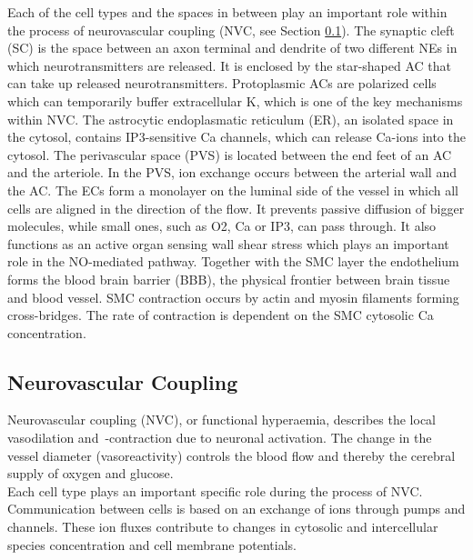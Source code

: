 Each of the cell types and the spaces in between play an important role within the process of neurovascular coupling (\gls{NVC}, see Section \ref{section:NVC}). The synaptic cleft (\gls{SC}) is the space between an axon terminal and dendrite of two different \gls{NE}s in which neurotransmitters are released. It is enclosed by the star-shaped \gls{AC} that can take up released neurotransmitters. Protoplasmic \gls{AC}s are  polarized cells which can temporarily buffer extracellular \gls{K}, which is one of the key mechanisms within \gls{NVC}.  The astrocytic endoplasmatic reticulum (\gls{ER}), an isolated space in the cytosol, contains \gls{IP3}-sensitive \gls{Ca} channels, which can release \gls{Ca}-ions into the cytosol. The perivascular space (\gls{PVS}) is located between the end feet of an \gls{AC} and the arteriole. In the \gls{PVS}, ion exchange occurs between the arterial wall and the \gls{AC}.  The \gls{EC}s form a monolayer on the luminal side of the vessel in which all cells are aligned in the direction of the flow. It prevents passive diffusion of bigger molecules, while small ones, such as \gls{O2}, \gls{Ca} or \gls{IP3}, can pass through.  It also functions as an active organ sensing wall shear stress which plays an important role in the \gls{NO}-mediated pathway. Together with the SMC layer the endothelium forms the blood brain barrier (BBB), the physical frontier between brain tissue and blood vessel.
\gls{SMC} contraction occurs by actin and myosin filaments forming cross-bridges. The rate of contraction is dependent on the \gls{SMC} cytosolic \gls{Ca} concentration.\\
 






\subsection{Neurovascular Coupling} \label{section:NVC}
Neurovascular coupling (\gls{NVC}), or functional hyperaemia, describes the local vasodilation and~-contraction due to neuronal activation. The change in the vessel diameter (vasoreactivity) controls the blood flow and thereby the cerebral supply of oxygen and glucose. \\

Each cell type plays an important specific role during the process of NVC. Communication between cells is based on an exchange of ions through pumps and channels. These ion fluxes contribute to changes in cytosolic and intercellular species concentration and cell membrane potentials.\\

